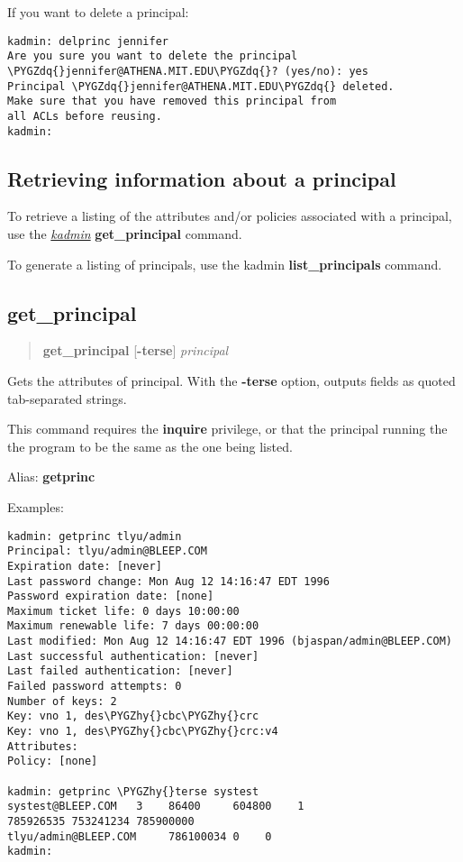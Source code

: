\documentclass[letterpaper,10pt,english]{sphinxmanual}
\def\PYGZhy{\char`\-}
\def\PYGZdq{\char`\"}
\begin{document}
If you want to delete a principal:

\begin{Verbatim}[commandchars=\\\{\}]
kadmin: delprinc jennifer
Are you sure you want to delete the principal
\PYGZdq{}jennifer@ATHENA.MIT.EDU\PYGZdq{}? (yes/no): yes
Principal \PYGZdq{}jennifer@ATHENA.MIT.EDU\PYGZdq{} deleted.
Make sure that you have removed this principal from
all ACLs before reusing.
kadmin:
\end{Verbatim}


\subsection{Retrieving information about a principal}
\label{admin/database:retrieving-information-about-a-principal}
To retrieve a listing of the attributes and/or policies associated
with a principal, use the {\hyperref[admin/admin_commands/kadmin_local:kadmin-1]{\emph{kadmin}}} \textbf{get\_principal} command.

To generate a listing of principals, use the kadmin
\textbf{list\_principals} command.


\subsection{get\_principal}
\label{admin/database:get-principal}\begin{quote}

\textbf{get\_principal} {[}\textbf{-terse}{]} \emph{principal}
\end{quote}

Gets the attributes of principal.  With the \textbf{-terse} option, outputs
fields as quoted tab-separated strings.

This command requires the \textbf{inquire} privilege, or that the principal
running the the program to be the same as the one being listed.

Alias: \textbf{getprinc}

Examples:

\begin{Verbatim}[commandchars=\\\{\}]
kadmin: getprinc tlyu/admin
Principal: tlyu/admin@BLEEP.COM
Expiration date: [never]
Last password change: Mon Aug 12 14:16:47 EDT 1996
Password expiration date: [none]
Maximum ticket life: 0 days 10:00:00
Maximum renewable life: 7 days 00:00:00
Last modified: Mon Aug 12 14:16:47 EDT 1996 (bjaspan/admin@BLEEP.COM)
Last successful authentication: [never]
Last failed authentication: [never]
Failed password attempts: 0
Number of keys: 2
Key: vno 1, des\PYGZhy{}cbc\PYGZhy{}crc
Key: vno 1, des\PYGZhy{}cbc\PYGZhy{}crc:v4
Attributes:
Policy: [none]

kadmin: getprinc \PYGZhy{}terse systest
systest@BLEEP.COM   3    86400     604800    1
785926535 753241234 785900000
tlyu/admin@BLEEP.COM     786100034 0    0
kadmin:
\end{Verbatim}
\end{document}
